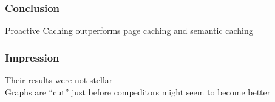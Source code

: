 \begin{frame}
\frametitle{Conclusion}
\Large
Proactive Caching outperforms page caching and semantic caching
\end{frame}

\begin{frame}
\frametitle{Impression}

Their results were not stellar\\

Graphs are "`cut"' just before compeditors might seem to become better

\end{frame}